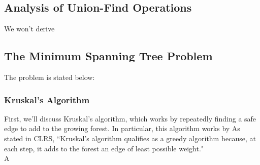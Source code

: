 \subsection{Analysis of Union-Find Operations}

We won't derive 



\subsection{The Minimum Spanning Tree Problem}

The  problem is stated below:




\subsubsection{Kruskal's Algorithm}

First, we'll discuss Kruskal's algorithm, which works by repeatedly finding a safe edge to add to the growing forest. In particular, this algorithm works by As stated in CLRS, ``Kruskal's algorithm qualifies as a greedy algorithm because, at each step, it adds to the forest an edge of least possible weight." \\

A 